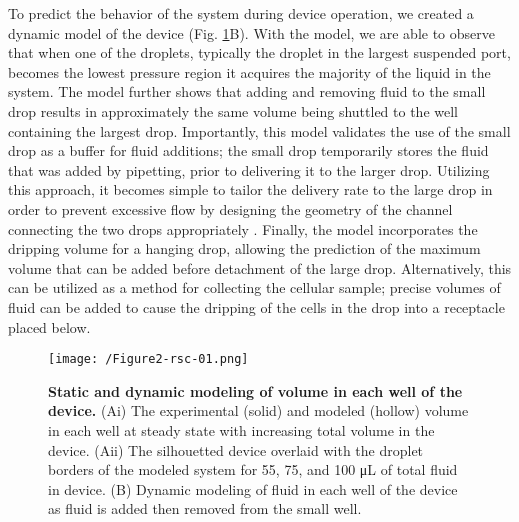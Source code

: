 To predict the behavior of the system during device operation, we created a dynamic model of the device (Fig. \ref{figure:Fig2}B). With the model, we are able to observe that when one of the droplets, typically the droplet in the largest suspended port, becomes the lowest pressure region it acquires the majority of the liquid in the system. The model further shows that adding and removing fluid to the small drop results in approximately the same volume being shuttled to the well containing the largest drop. Importantly, this model validates the use of the small drop as a buffer for fluid additions; the small drop temporarily stores the fluid that was added by pipetting, prior to delivering it to the larger drop. Utilizing this approach, it becomes simple to tailor the delivery rate to the large drop in order to prevent excessive flow by designing the geometry of the channel connecting the two drops appropriately \cite{Berthier2011}. Finally, the model incorporates the dripping volume for a hanging drop, allowing the prediction of the maximum volume that can be added before detachment of the large drop. Alternatively, this can be utilized as a method for collecting the cellular sample; precise volumes of fluid can be added to cause the dripping of the cells in the drop into a receptacle placed below.

\begin{figure}[h!] %
\centering
\texttt{[image: /Figure2-rsc-01.png]}
\caption[\textbf{Static and dynamic modeling of volume in each well of the device.}]{\textbf{Static and dynamic modeling of volume in each well of the device.} (Ai) The experimental (solid) and modeled (hollow) volume in each well at steady state with increasing total volume in the device. (Aii) The silhouetted device overlaid with the droplet borders of the modeled system for 55, 75, and 100 μL of total fluid in device. (B) Dynamic modeling of fluid in each well of the device as fluid is added then removed from the small well.}
\label{figure:Fig2}
\end{figure}


